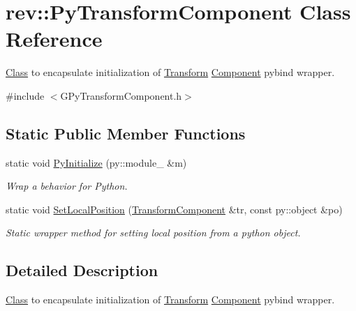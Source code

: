 \hypertarget{classrev_1_1_py_transform_component}{}\section{rev\+::Py\+Transform\+Component Class Reference}
\label{classrev_1_1_py_transform_component}


\mbox{\hyperlink{struct_class}{Class}} to encapsulate initialization of \mbox{\hyperlink{classrev_1_1_transform}{Transform}} \mbox{\hyperlink{classrev_1_1_component}{Component}} pybind wrapper.  




{\ttfamily \#include $<$G\+Py\+Transform\+Component.\+h$>$}

\subsection*{Static Public Member Functions}
\begin{DoxyCompactItemize}
\item 
\mbox{\label{classrev_1_1_py_transform_component_ae3c28213c0310979feb34208c1dad15c}} 
static void \mbox{\hyperlink{classrev_1_1_py_transform_component_ae3c28213c0310979feb34208c1dad15c}{Py\+Initialize}} (py\+::module\+\_\+ \&m)
\begin{DoxyCompactList}\small\item\em Wrap a behavior for Python. \end{DoxyCompactList}\item 
\mbox{\label{classrev_1_1_py_transform_component_ac66f194c53d81117a001196a19e0494f}} 
static void \mbox{\hyperlink{classrev_1_1_py_transform_component_ac66f194c53d81117a001196a19e0494f}{Set\+Local\+Position}} (\mbox{\hyperlink{classrev_1_1_transform_component}{Transform\+Component}} \&tr, const py\+::object \&po)
\begin{DoxyCompactList}\small\item\em Static wrapper method for setting local position from a python object. \end{DoxyCompactList}\end{DoxyCompactItemize}


\subsection{Detailed Description}
\mbox{\hyperlink{struct_class}{Class}} to encapsulate initialization of \mbox{\hyperlink{classrev_1_1_transform}{Transform}} \mbox{\hyperlink{classrev_1_1_component}{Component}} pybind wrapper. 


